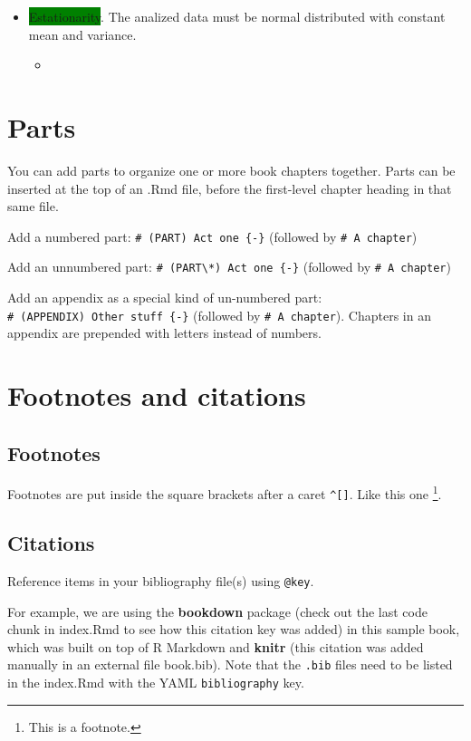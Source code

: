 \documentclass[
]{book}
\providecommand{\tightlist}{%
  \setlength{\itemsep}{0pt}\setlength{\parskip}{0pt}}
\newcommand{\key}[1]{\colorbox{green}{#1}}
\theoremstyle{definition}
\theoremstyle{definition}
\theoremstyle{definition}
\theoremstyle{definition}
\theoremstyle{remark}
\begin{document}
\begin{itemize}
\item
  \key{Estationarity}. The analized data must be normal distributed with constant mean and variance.

  \begin{itemize}
  \tightlist
  \item
  \end{itemize}
\end{itemize}

\chapter{Parts}\label{parts}

You can add parts to organize one or more book chapters together. Parts can be inserted at the top of an .Rmd file, before the first-level chapter heading in that same file.

Add a numbered part: \texttt{\#\ (PART)\ Act\ one\ \{-\}} (followed by \texttt{\#\ A\ chapter})

Add an unnumbered part: \texttt{\#\ (PART\textbackslash{}*)\ Act\ one\ \{-\}} (followed by \texttt{\#\ A\ chapter})

Add an appendix as a special kind of un-numbered part: \texttt{\#\ (APPENDIX)\ Other\ stuff\ \{-\}} (followed by \texttt{\#\ A\ chapter}). Chapters in an appendix are prepended with letters instead of numbers.

\chapter{Footnotes and citations}\label{footnotes-and-citations}

\section{Footnotes}\label{footnotes}

Footnotes are put inside the square brackets after a caret \texttt{\^{}{[}{]}}. Like this one \footnote{This is a footnote.}.

\section{Citations}\label{citations}

Reference items in your bibliography file(s) using \texttt{@key}.

For example, we are using the \textbf{bookdown} package \citep{R-bookdown} (check out the last code chunk in index.Rmd to see how this citation key was added) in this sample book, which was built on top of R Markdown and \textbf{knitr} \citep{xie2015} (this citation was added manually in an external file book.bib).
Note that the \texttt{.bib} files need to be listed in the index.Rmd with the YAML \texttt{bibliography} key.
\end{document}
